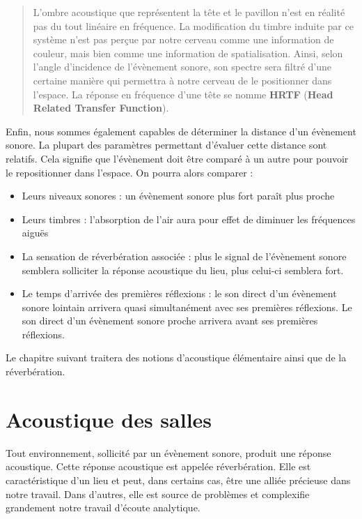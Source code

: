 \documentclass[
]{book}
\providecommand{\tightlist}{%
  \setlength{\itemsep}{0pt}\setlength{\parskip}{0pt}}
\begin{document}
\begin{quote}
L'ombre acoustique que représentent la tête et le pavillon n'est en réalité pas du tout linéaire en fréquence. La modification du timbre induite par ce système n'est pas perçue par notre cerveau comme une information de couleur, mais bien comme une information de spatialisation. Ainsi, selon l'angle d'incidence de l'évènement sonore, son spectre sera filtré d'une certaine manière qui permettra à notre cerveau de le positionner dans l'espace. La réponse en fréquence d'une tête se nomme \textbf{HRTF} (\textbf{Head Related Transfer Function}).
\end{quote}

Enfin, nous sommes également capables de déterminer la distance d'un évènement sonore. La plupart des paramètres permettant d'évaluer cette distance sont relatifs. Cela signifie que l'évènement doit être comparé à un autre pour pouvoir le repositionner dans l'espace. On pourra alors comparer :

\begin{itemize}
\tightlist
\item
  Leurs niveaux sonores : un évènement sonore plus fort paraît plus proche
\item
  Leurs timbres : l'absorption de l'air aura pour effet de diminuer les fréquences aiguës
\item
  La sensation de réverbération associée : plus le signal de l'évènement sonore semblera solliciter la réponse acoustique du lieu, plus celui-ci semblera fort.
\item
  Le temps d'arrivée des premières réflexions : le son direct d'un évènement sonore lointain arrivera quasi simultanément avec ses premières réflexions. Le son direct d'un évènement sonore proche arrivera avant ses premières réflexions.
\end{itemize}

Le chapitre suivant traitera des notions d'acoustique élémentaire ainsi que de la réverbération.

\hypertarget{acoustique-des-salles}{%
\chapter{Acoustique des salles}\label{acoustique-des-salles}}

Tout environnement, sollicité par un évènement sonore, produit une réponse acoustique. Cette réponse acoustique est appelée réverbération. Elle est caractéristique d'un lieu et peut, dans certains cas, être une alliée précieuse dans notre travail. Dans d'autres, elle est source de problèmes et complexifie grandement notre travail d'écoute analytique.
\end{document}
